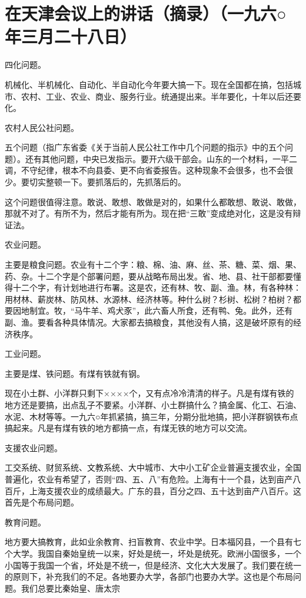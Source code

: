 \section[在天津会议上的讲话（摘录）（一九六○年三月二十八日）]{在天津会议上的讲话（摘录）（一九六○年三月二十八日）}


四化问题。

机械化、半机械化、自动化、半自动化今年要大搞一下。现在全国都在搞，包括城市、农村、工业、农业、商业、服务行业。统通提出来。半年要化，十年以后还要化。

农村人民公社问题。

五个问题（指广东省委《关于当前人民公社工作中几个问题的指示》中的五个问题）。还有其他问题，中央已发指示。要开六级干部会。山东的一个材料，一平二调，不守纪律，根本不向县委、更不向省委报告。这种现象不会很多，也不会很少。要切实整顿一下。要抓落后的，先抓落后的。

这个问题很值得注意。敢说、敢想、敢做是对的，如果什么都敢想、敢说、敢做，那就不对了。有所不为，然后才能有所为。现在把“三敢”变成绝对化，这是没有辩证法。

农业问题。

主要是粮食问题。农业有十二个字：粮、棉、油、麻、丝、茶、糖、菜、烟、果、药、杂。十二个字是个部署问题，要从战略布局出发。省、地、县、社干部都要懂得十二个字，有计划地进行布署。这是农，还有林、牧、副、渔。林，有各种林：用材林、薪炭林、防风林、水源林、经济林等。种什么树？杉树、松树？柏树？都要因地制宜。牧，“马牛羊、鸡犬豕”，此六畜人所食，还有鸭、兔。此外，还有副、渔。要看各种具体情况。大家都去搞粮食，其他没有人搞，这是破坏原有的经济秩序。

工业问题。

主要是煤、铁问题。有煤有铁就有钢。

现在小土群、小洋群只剩下××××个，又有点冷冷清清的样子。凡是有煤有铁的地方还是要搞，出点乱子不要紧。小洋群、小土群搞什么？搞金属、化工、石油、水泥、木材等等。一九六○年抓紧搞，搞三年，分期分批地搞，把小洋群钢铁布点搞起来。凡是有煤有铁的地方都搞一点，有煤无铁的地方可以交流。

支援农业问题。

工交系统、财贸系统、文教系统、大中城市、大中小工矿企业普遍支援农业，全国普遍化，农业有希望了，否则“四、五、八”有危险。上海有十一个县，达到亩产八百斤，上海支援农业的成绩最大。广东的县，百分之四、五十达到亩产八百斤。这首先是个布局问题。

教育问题。

地方要大搞教育，此如业余教育、扫盲教育、农业中学。日本福冈县，一个县有七个大学。我国自秦始皇统一以来，好处是统一，坏处是统死。欧洲小国很多，一个小国等于我国一个省，坏处是不统一，但是经济、文化大大发展了。我们要在统一的原则下，补充我们的不足。各地要办大学，各部门也要办大学。这也是个布局问题。我们总要比秦始皇、唐太宗

